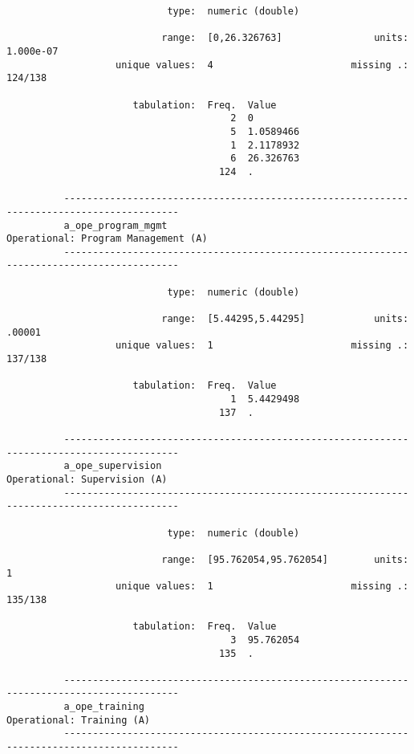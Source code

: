 \documentclass{article}
\begin{document}
\begin{verbatim}
                            type:  numeric (double)
          
                           range:  [0,26.326763]                units:  1.000e-07
                   unique values:  4                        missing .:  124/138
          
                      tabulation:  Freq.  Value
                                       2  0
                                       5  1.0589466
                                       1  2.1178932
                                       6  26.326763
                                     124  .
          
          ------------------------------------------------------------------------------------------
          a_ope_program_mgmt                                     Operational: Program Management (A)
          ------------------------------------------------------------------------------------------
          
                            type:  numeric (double)
          
                           range:  [5.44295,5.44295]            units:  .00001
                   unique values:  1                        missing .:  137/138
          
                      tabulation:  Freq.  Value
                                       1  5.4429498
                                     137  .
          
          ------------------------------------------------------------------------------------------
          a_ope_supervision                                             Operational: Supervision (A)
          ------------------------------------------------------------------------------------------
          
                            type:  numeric (double)
          
                           range:  [95.762054,95.762054]        units:  1
                   unique values:  1                        missing .:  135/138
          
                      tabulation:  Freq.  Value
                                       3  95.762054
                                     135  .
          
          ------------------------------------------------------------------------------------------
          a_ope_training                                                   Operational: Training (A)
          ------------------------------------------------------------------------------------------
          

\end{verbatim}
\end{document}

